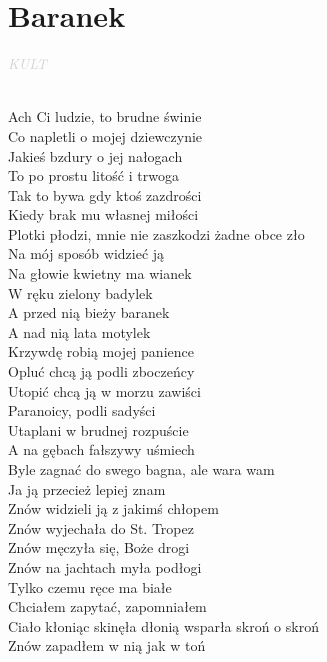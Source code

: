 \documentclass[a5paper, 10pt]{book}
\begin{document}
\section{Baranek}\textcolor{lightgray}{\textit{KULT}}\\~\\
\begin{minipage}[t]{0.8\textwidth}
  Ach Ci ludzie, to brudne świnie\\
  Co napletli o mojej dziewczynie\\
  Jakieś bzdury o jej nałogach\\
  To po prostu litość i trwoga\\
  Tak to bywa gdy ktoś zazdrości\\
  Kiedy brak mu własnej miłości\\
Plotki płodzi, mnie nie zaszkodzi żadne obce zło\\
Na mój sposób widzieć ją\\

\hspace*{5mm}Na głowie kwietny ma wianek\\
\hspace*{5mm}W ręku zielony badylek\\
\hspace*{5mm}A przed nią bieży baranek\\
\hspace*{5mm}A nad nią lata motylek\\

Krzywdę robią mojej panience\\
Opluć chcą ją podli zboczeńcy\\
Utopić chcą ją w morzu zawiści\\
Paranoicy, podli sadyści\\
Utaplani w brudnej rozpuście\\
A na gębach fałszywy uśmiech\\
Byle zagnać do swego bagna, ale wara wam\\
Ja ją przecież lepiej znam\\

Znów widzieli ją z jakimś chłopem\\
Znów wyjechała do St. Tropez\\
Znów męczyła się, Boże drogi\\
Znów na jachtach myła podłogi\\
Tylko czemu ręce ma białe\\
Chciałem zapytać, zapomniałem\\
Ciało kłoniąc skinęła dłonią wsparła skroń o skroń\\
Znów zapadłem w nią jak w toń\\


\end{minipage}
\end{document}
